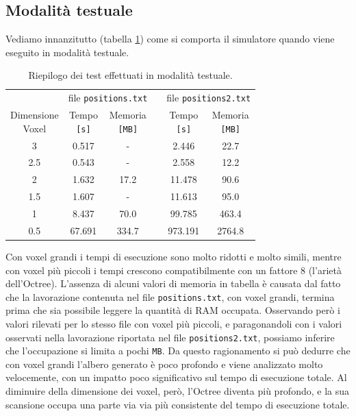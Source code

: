 \subsection{Modalità testuale}
Vediamo innanzitutto (tabella \ref{tab:graphicsnone}) come si comporta il simulatore quando viene eseguito in modalità testuale.
\begin{table}[h]
	\centering
	\begin{tabular}{cccccc}
		\toprule
		& \multicolumn{2}{c}{file \texttt{positions.txt}} & & \multicolumn{2}{c}{file \texttt{positions2.txt}}\\
		\cmidrule(r){2-3}\cmidrule(r){5-6}
			\shortstack{Dimensione\\ Voxel} & \shortstack{Tempo \\\texttt{[s]}} & \shortstack{Memoria \\\texttt{[MB]}} & & \shortstack{Tempo \\\texttt{[s]}} & \shortstack{Memoria \\\texttt{[MB]}}\\
		\midrule
			3   & 0.517  & -     & & 2.446   & 22.7   \\
			2.5 & 0.543  & -     & & 2.558   & 12.2   \\
			2   & 1.632  & 17.2  & & 11.478  & 90.6   \\
			1.5 & 1.607  & -     & & 11.613  & 95.0   \\
			1   & 8.437  & 70.0  & & 99.785  & 463.4  \\
			0.5 & 67.691 & 334.7 & & 973.191 & 2764.8 \\
		\bottomrule
	\end{tabular}
	\caption{Riepilogo dei test effettuati in modalità testuale.}
	\label{tab:graphicsnone}
\end{table}
Con voxel grandi i tempi di esecuzione sono molto ridotti e molto simili, mentre con voxel più piccoli i tempi crescono compatibilmente con un fattore 8 (l'arietà dell'Octree). L'assenza di alcuni valori di memoria in tabella è causata dal fatto che la lavorazione contenuta nel file \texttt{positions.txt}, con voxel grandi, termina prima che sia possibile leggere la quantità di RAM occupata. Osservando però i valori rilevati per lo stesso file con voxel più piccoli, e paragonandoli con i valori osservati nella lavorazione riportata nel file \texttt{positions2.txt}, possiamo inferire che l'occupazione si limita a pochi \texttt{MB}. Da questo ragionamento si può dedurre che con voxel grandi l'albero generato è poco profondo e viene analizzato molto velocemente, con un impatto poco significativo sul tempo di esecuzione totale. Al diminuire della dimensione dei voxel, però, l'Octree diventa più profondo, e la sua scansione occupa una parte via via più consistente del tempo di esecuzione totale.

